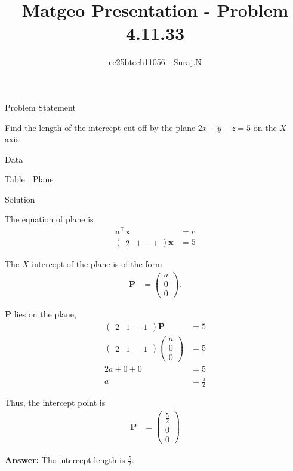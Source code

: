 \documentclass{beamer}
\title{Matgeo Presentation - Problem 4.11.33}
\author{ee25btech11056 - Suraj.N}
\numberwithin{equation}{section}
\theoremstyle{remark}
\newcommand{\myvec}[1]{\ensuremath{\begin{pmatrix}#1\end{pmatrix}}}
\let\vec\mathbf
\begin{document}
\begin{frame}
  \titlepage
\end{frame}

\begin{frame}{Problem Statement}

Find the length of the intercept cut off by the plane $2x+y-z=5$ on the $X$ axis.

\end{frame}

\begin{frame}{Data}

\begin{table}[h!]
  \centering
  
  \caption*{Table : Plane}
  \label{4.11.33}
\end{table}

\end{frame}

\begin{frame}{Solution}

The equation of plane is 
\begin{align}
  \vec{n}^\top\vec{x} &= c\\ 
  \myvec{2 & 1 & -1}\vec{x} &= 5
\end{align}

The $X$-intercept of the plane is of the form
\begin{align}
\vec{P} &= \myvec{a\\0\\0}.
\end{align}

$\vec{P}$ lies on the plane,
\begin{align}
\myvec{2 & 1 & -1}\vec{P} &= 5 \\
\myvec{2 & 1 & -1}\myvec{a\\0\\0} &= 5 \\
2a + 0 + 0 &= 5 \\
a &= \frac{5}{2}
\end{align}

\end{frame}

\begin{frame}

Thus, the intercept point is
\begin{align}
\vec{P} &= \myvec{\frac{5}{2}\\0\\0}
\end{align}

\textbf{Answer:} The intercept length is $\frac{5}{2}$.

\end{frame}
\end{document}

